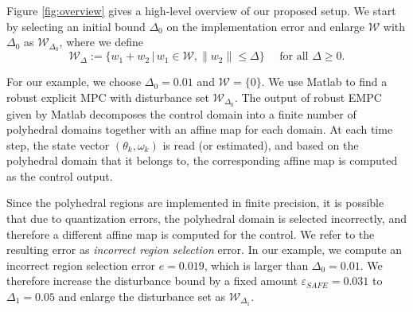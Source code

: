 
	
Figure \ref{fig:overview} gives a high-level overview of our proposed setup.
We start by selecting an initial bound $\Delta_0$ on the implementation error and enlarge $\mathcal W$ with $\Delta_0$ as $\mathcal W_{\Delta_0}$, where
we define
\begin{equation}\label{eq:W_delta}
\mathcal W_{\Delta} := \{w_1+w_2 \,|\, w_1\in \mathcal W, \|w_2\|\le \Delta\}
\quad\text{ for all } \Delta\ge 0.
\end{equation}
 
For our example, we choose $\Delta_0=0.01$ and $\mathcal W = \{0\}$. 
We use Matlab to find a robust explicit MPC with disturbance set $\mathcal W_{\Delta_0}$. 
%
The output of robust EMPC given by Matlab decomposes the control domain into a
finite number of polyhedral domains together with an affine map for each domain. 
At each time step, the state vector $(\theta_k, \omega_k)$ is read (or estimated), and based on the polyhedral domain
that it belongs to, the corresponding affine map is computed as the control output. 

Since the polyhedral regions are implemented in finite precision, 
it is possible that due to quantization errors, the polyhedral domain is selected incorrectly, and therefore
a different affine map is computed for the control.
We refer to the resulting error as \emph{incorrect region selection} error.
In our example, we compute an incorrect region selection error $e = 0.019$, which is larger
than $\Delta_0=0.01$. We therefore increase the disturbance bound by a fixed amount $\varepsilon_{SAFE}=0.031$ to
$\Delta_1 = 0.05$ and enlarge the disturbance set as $\mathcal W_{\Delta_1}$. 

